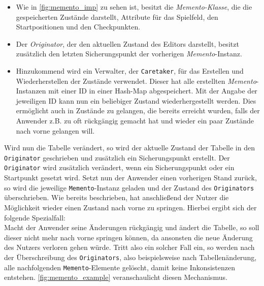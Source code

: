 \begin{itemize}
\item Wie in \autoref{fig:memento_imp} zu sehen ist, besitzt die \textit{Memento-Klasse}, die die gespeicherten Zustände darstellt, Attribute für das Spielfeld, den Startpositionen und den Checkpunkten.
\item Der \textit{Originator}, der den aktuellen Zustand des Editors darstellt, besitzt zusätzlich den letzten Sicherungspunkt der vorherigen \textit{Memento}-Instanz.
\item Hinzukommend wird ein Verwalter, der \texttt{Caretaker}, für das Erstellen und Wiederherstellen der Zustände verwendet. Dieser hat alle erstellten \textit{Memento}-Instanzen mit einer ID in einer Hash-Map abgespeichert. Mit der Angabe der jeweiligen ID kann nun ein beliebiger Zustand wiederhergestellt werden. Dies ermöglicht auch in Zustände zu gelangen, die bereits erreicht wurden, falls der Anwender z.B. zu oft rückgängig gemacht hat und wieder ein paar Zustände nach vorne gelangen will. 
\end{itemize}
Wird nun die Tabelle verändert, so wird der aktuelle Zustand der Tabelle in den \texttt{Originator} geschrieben und zusätzlich ein Sicherungspunkt erstellt. Der \texttt{Originator} wird zusätzlich verändert, wenn ein Sicherungspunkt oder ein Startpunkt gesetzt wird. Setzt nun der Anwender einen vorherigen Stand zurück, so wird die jeweilige \texttt{Memento}-Instanz geladen und der Zustand des \texttt{Originators} überschrieben. Wie bereits beschrieben, hat anschließend der Nutzer die Möglichkeit wieder einen Zustand nach vorne zu springen. Hierbei ergibt sich der folgende Spezialfall:\\
Macht der Anwender seine Änderungen rückgängig und ändert die Tabelle, so soll dieser nicht mehr nach vorne springen können, da ansonsten die neue Änderung des Nutzers verloren gehen würde. Tritt also ein solcher Fall ein, so werden nach der Überschreibung des \texttt{Originators}, also beispielsweise nach Tabellenänderung, alle nachfolgenden \texttt{Memento}-Elemente gelöscht, damit keine Inkonsistenzen entstehen. \autoref{fig:memento_example} veranschaulicht diesen Mechanismus.\\ 

